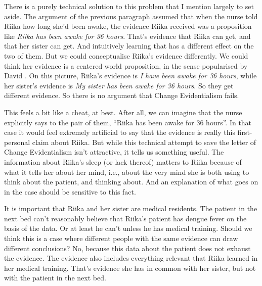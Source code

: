 There is a purely technical solution to this problem that I mention largely to set aside. The argument of the previous paragraph assumed that when the nurse told \gls{Riika} how long she'd been awake, the evidence \gls{Riika} received was a proposition like \emph{Riika has been awake for 36 hours}. That's evidence that \gls{Riika} can get, and that her sister can get. And intuitively learning that has a different effect on the two of them. But we could conceptualise \gls{Riika}'s evidence differently. We could think her evidence is a centered world proposition, in the sense popularised by David \citet{Lewis1979}. On this picture, \gls{Riika}'s evidence is \emph{I have been awake for 36 hours}, while her sister's evidence is \emph{My sister has been awake for 36 hours}. So they get different evidence. So there is no argument that Change Evidentialism fails.

This feels a bit like a cheat, at best. After all, we can imagine that the nurse explicitly says to the pair of them, ``\gls{Riika} has been awake for 36 hours''. In that case it would feel extremely artificial to say that the evidence is really this first-personal claim about \gls{Riika}. But while this technical attempt to save the letter of Change Evidentialism isn't attractive, it tells us something useful. The information about \gls{Riika}'s sleep (or lack thereof) matters to \gls{Riika} because of what it tells her about her mind, i.e., about the very mind she is both using to think about the patient, and thinking about. And an explanation of what goes on in the case should be sensitive to this fact.

It is important that \gls{Riika} and her sister are medical residents. The patient in the next bed can't reasonably believe that \gls{Riika}'s patient has dengue fever on the basis of the data. Or at least he can't unless he has medical training. Should we think this is a case where different people with the same evidence can draw different conclusions? No, because this data about the patient does not exhaust the evidence. The evidence also includes everything relevant that \gls{Riika} learned in her medical training. That's evidence she has in common with her sister, but not with the patient in the next bed.

